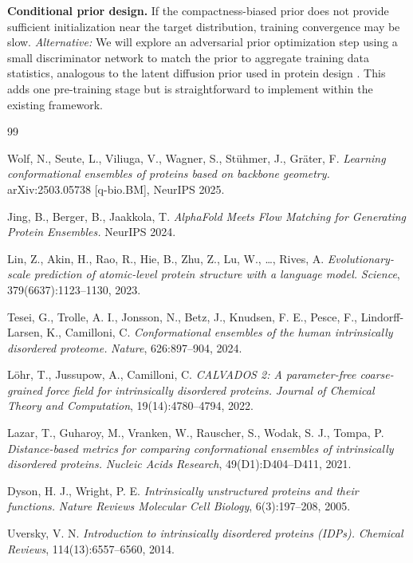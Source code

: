 \documentclass[12pt]{article}
\begin{document}
\noindent\textbf{Conditional prior design.}
If the compactness-biased prior does not provide sufficient initialization near the target
distribution, training convergence may be slow.
\textit{Alternative:} We will explore an adversarial prior optimization step using a small
discriminator network to match the prior to aggregate training data statistics, analogous
to the latent diffusion prior used in protein design \cite{ingraham2023se3}.
This adds one pre-training stage but is straightforward to implement within the
existing framework.

\begin{thebibliography}{99}

Wolf, N., Seute, L., Viliuga, V., Wagner, S., St\"{u}hmer, J., Gr\"{a}ter, F.
\textit{Learning conformational ensembles of proteins based on backbone geometry.}
arXiv:2503.05738 [q-bio.BM], NeurIPS 2025.

Jing, B., Berger, B., Jaakkola, T.
\textit{AlphaFold Meets Flow Matching for Generating Protein Ensembles.}
NeurIPS 2024.

Lin, Z., Akin, H., Rao, R., Hie, B., Zhu, Z., Lu, W., \ldots, Rives, A.
\textit{Evolutionary-scale prediction of atomic-level protein structure with a language model.}
\textit{Science}, 379(6637):1123--1130, 2023.

Tesei, G., Trolle, A. I., Jonsson, N., Betz, J., Knudsen, F. E., Pesce, F., Lindorff-Larsen, K., Camilloni, C.
\textit{Conformational ensembles of the human intrinsically disordered proteome.}
\textit{Nature}, 626:897--904, 2024.

L\"{o}hr, T., Jussupow, A., Camilloni, C.
\textit{CALVADOS 2: A parameter-free coarse-grained force field for intrinsically disordered proteins.}
\textit{Journal of Chemical Theory and Computation}, 19(14):4780--4794, 2022.

Lazar, T., Guharoy, M., Vranken, W., Rauscher, S., Wodak, S. J., Tompa, P.
\textit{Distance-based metrics for comparing conformational ensembles of intrinsically disordered proteins.}
\textit{Nucleic Acids Research}, 49(D1):D404--D411, 2021.

Dyson, H. J., Wright, P. E.
\textit{Intrinsically unstructured proteins and their functions.}
\textit{Nature Reviews Molecular Cell Biology}, 6(3):197--208, 2005.

Uversky, V. N.
\textit{Introduction to intrinsically disordered proteins (IDPs).}
\textit{Chemical Reviews}, 114(13):6557--6560, 2014.


\end{thebibliography}
\end{document}
